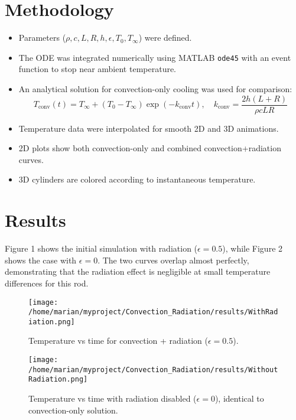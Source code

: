 \documentclass[12pt,a4paper]{article}
\begin{document}
\section{Methodology}
\begin{itemize}
\item Parameters (\(\rho, c, L, R, h, \epsilon, T_0, T_\infty\)) were defined.
\item The ODE was integrated numerically using MATLAB \texttt{ode45} with an event function to stop near ambient temperature.
\item An analytical solution for convection-only cooling was used for comparison:
\begin{equation}
T_\text{conv}(t) = T_\infty + (T_0 - T_\infty) \exp(-k_\text{conv} t), \quad k_\text{conv} = \frac{2 h (L+R)}{\rho c L R}
\end{equation}
\item Temperature data were interpolated for smooth 2D and 3D animations.
\item 2D plots show both convection-only and combined convection+radiation curves.
\item 3D cylinders are colored according to instantaneous temperature.
\end{itemize}

\section{Results}
Figure 1 shows the initial simulation with radiation (\(\epsilon = 0.5\)), while Figure 2 shows the case with \(\epsilon = 0\). The two curves overlap almost perfectly, demonstrating that the radiation effect is negligible at small temperature differences for this rod.  

\begin{figure}[H]
\centering
\texttt{[image: /home/marian/myproject/Convection\_Radiation/results/WithRadiation.png]}
\caption{Temperature vs time for convection + radiation (\(\epsilon = 0.5\)).}
\label{fig:init}
\end{figure}

\begin{figure}[H]
\centering
\texttt{[image: /home/marian/myproject/Convection\_Radiation/results/WithoutRadiation.png]}
\caption{Temperature vs time with radiation disabled (\(\epsilon = 0\)), identical to convection-only solution.}
\label{fig:eps0}
\end{figure}
\end{document}
